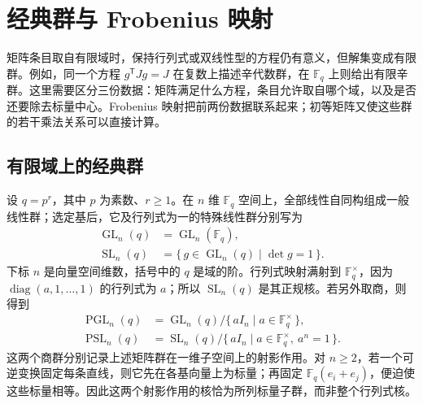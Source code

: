 
\section{经典群与 Frobenius 映射}
\label{b5:sec:F01}

矩阵条目取自有限域时，保持行列式或双线性型的方程仍有意义，但解集变成有限群。例如，同一个方程 \(g^{\mathsf T}Jg=J\) 在复数上描述辛代数群，在 \(\mathbb F_q\) 上则给出有限辛群。这里需要区分三份数据：矩阵满足什么方程，条目允许取自哪个域，以及是否还要除去标量中心。Frobenius 映射把前两份数据联系起来；初等矩阵又使这些群的若干乘法关系可以直接计算。

\subsection{有限域上的经典群}
\label{b5:subsec:F01:01}

设 \(q=p^r\)，其中 \(p\) 为素数、\(r\ge1\)。在 \(n\) 维 \(\mathbb F_q\) 空间上，全部线性自同构组成一般线性群；选定基后，它及行列式为一的特殊线性群分别写为
\[
	\begin{aligned}
		\operatorname{GL}_n(q)&=\operatorname{GL}_n(\mathbb F_q),\\
		\operatorname{SL}_n(q)&=\{\,g\in\operatorname{GL}_n(q)\mid\det g=1\,\}.
	\end{aligned}
\]
下标 \(n\) 是向量空间维数，括号中的 \(q\) 是域的阶。行列式映射满射到 \(\mathbb F_q^\times\)，因为 \(\operatorname{diag}(a,1,\ldots,1)\) 的行列式为 \(a\)；所以 \(\operatorname{SL}_n(q)\) 是其正规核。若另外取商，则得到
\[
	\begin{aligned}
		\operatorname{PGL}_n(q)&=\operatorname{GL}_n(q)/\{\,aI_n\mid a\in\mathbb F_q^\times\,\},\\
		\operatorname{PSL}_n(q)&=\operatorname{SL}_n(q)/\{\,aI_n\mid a\in\mathbb F_q^\times,\ a^n=1\,\}.
	\end{aligned}
\]
这两个商群分别记录上述矩阵群在一维子空间上的射影作用。对 \(n\ge2\)，若一个可逆变换固定每条直线，则它先在各基向量上为标量；再固定 \(\mathbb F_q(e_i+e_j)\)，便迫使这些标量相等。因此这两个射影作用的核恰为所列标量子群，而非整个行列式核。

